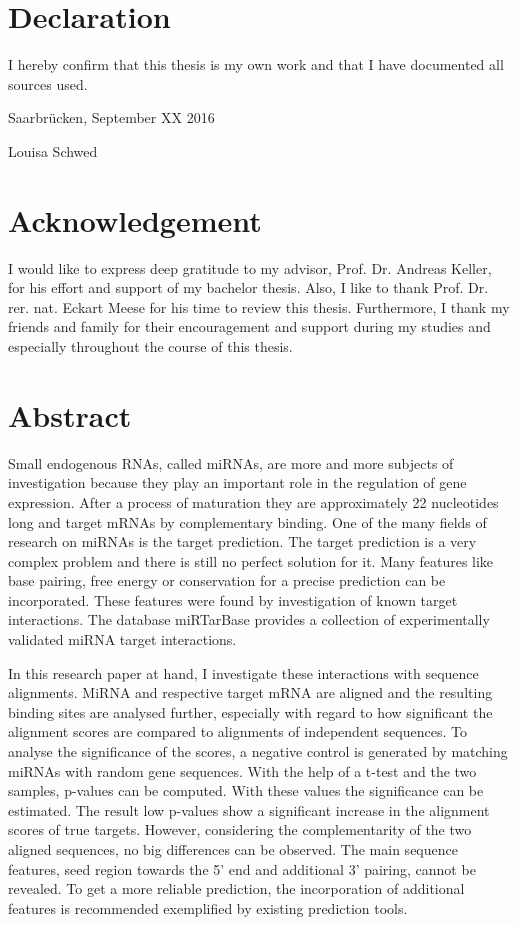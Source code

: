 \documentclass[12pt,  a4paper]{report}
\begin{document}
\section*{Declaration}
I hereby confirm that this thesis is my own work and that I have documented all sources used. 

\vspace{1cm}

\noindent Saarbr\"ucken, September XX 2016
\vspace{1.5cm}

\noindent Louisa Schwed
\newpage

\newpage

\section*{Acknowledgement}
I would like to express deep gratitude to my advisor, Prof. Dr. Andreas Keller, for his effort and support of my bachelor thesis. Also, I like to thank Prof. Dr. rer. nat. Eckart Meese for his time  to review this thesis. Furthermore, I thank my friends and family for their encouragement and support during my studies and especially throughout the course of this thesis. 

\newpage


\section*{Abstract}

Small endogenous RNAs, called miRNAs, are more and more subjects of investigation because they play an important role in the regulation of gene expression. After a process of maturation they are approximately 22 nucleotides long and target mRNAs by complementary binding. One of the many fields of research on miRNAs is the target prediction. The target prediction is a very complex problem and there is still no perfect solution for it. Many features like base pairing, free energy or conservation for a precise prediction can be incorporated. These features were found by investigation of known target interactions. The database miRTarBase provides a collection of experimentally validated miRNA target interactions. 

In this research paper at hand, I investigate these interactions with sequence alignments. MiRNA and respective target mRNA are aligned and the resulting binding sites are analysed further, especially with regard to how significant the alignment scores are compared to alignments of independent sequences. To analyse the significance of the scores, a negative control is generated by matching miRNAs with random gene sequences. With the help of a t-test and the two samples, p-values can be computed. With these values the significance can be estimated. The result low p-values show a significant increase in the alignment scores of true targets. However, considering the complementarity of the two aligned sequences, no big differences can be observed. The main sequence features, seed region towards the 5' end and additional 3' pairing, cannot be revealed. To get a more reliable prediction, the incorporation of additional features is recommended exemplified by existing prediction tools.
 
\end{document}
